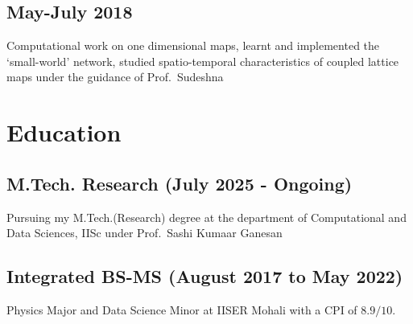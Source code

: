 \documentclass{article}
\begin{document}


\subsection{May-July 2018}

Computational work on one dimensional maps,
learnt and implemented the `small-world' network,
studied spatio-temporal characteristics
of coupled lattice maps
under the guidance of Prof.~Sudeshna%

\section{Education}

\subsection{M.Tech. Research (July 2025 - Ongoing)}
Pursuing my M.Tech.(Research) degree at the
department of Computational and Data Sciences, {IISc}
under Prof.~Sashi Kumaar Ganesan

\subsection{Integrated BS-MS (August 2017 to May 2022)}
Physics Major and Data Science Minor
at {IISER Mohali} with a CPI of $8.9 / 10$.

\end{document}
